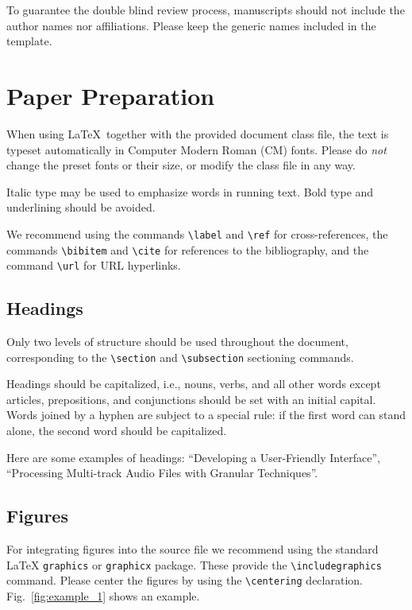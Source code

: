 \documentclass[runningheads,a4paper]{llncs}
\begin{document}
To guarantee the double blind review process, manuscripts should not include
the author names nor affiliations. Please keep the generic names included in the
template.

\section{Paper Preparation}

When using \LaTeX\ together with the provided document class file, the text
is typeset automatically in Computer Modern Roman (CM) fonts. Please do
\emph{not} change the preset fonts or their size, or modify the class file
in any way.

Italic type may be used to emphasize words in running text. Bold type and
underlining should be avoided.

We recommend using the commands \verb+\label+ and \verb+\ref+ for
cross-references, the commands \verb+\bibitem+ and \verb+\cite+ for
references to the bibliography, and the command \verb+\url+ for URL
hyperlinks.


\subsection{Headings}

Only two levels of structure should be used throughout the document,
corresponding to the \verb+\section+ and \verb+\subsection+ sectioning
commands.

Headings should be capitalized, i.e., nouns, verbs, and all other words
except articles, prepositions, and conjunctions should be set with an
initial capital. Words joined by a hyphen are subject to a special rule: if
the first word can stand alone, the second word should be capitalized.

Here are some examples of headings: ``Developing a User-Friendly
Interface'', ``Processing Multi-track Audio Files with Granular Techniques''.

\subsection{Figures}

For integrating figures into the source file we recommend using the
standard \LaTeX{} \verb+graphics+ or \verb+graphicx+ package. These provide
the \verb+\includegraphics+ command. Please center the figures by using the
\verb+\centering+ declaration. Fig.~\ref{fig:example_1} shows an example.
\end{document}
